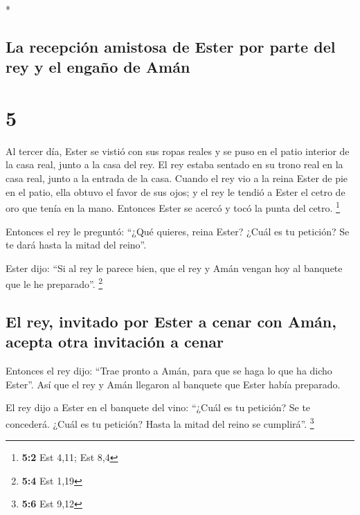 \begin{paracol}{2}
\begin{otherlanguage}{english}
\end{otherlanguage}

\switchcolumn[0]*

\hypertarget{la-recepciuxf3n-amistosa-de-ester-por-parte-del-rey-y-el-engauxf1o-de-amuxe1n}{%
\subsection{La recepción amistosa de Ester por parte del rey y el engaño
de
Amán}\label{la-recepciuxf3n-amistosa-de-ester-por-parte-del-rey-y-el-engauxf1o-de-amuxe1n}}

\hypertarget{section-8}{%
\section{5}\label{section-8}}

 Al tercer día, Ester se vistió con sus ropas reales y se
puso en el patio interior de la casa real, junto a la casa del rey. El
rey estaba sentado en su trono real en la casa real, junto a la entrada
de la casa.  Cuando el rey vio a la reina Ester de pie en
el patio, ella obtuvo el favor de sus ojos; y el rey le tendió a Ester
el cetro de oro que tenía en la mano. Entonces Ester se acercó y tocó la
punta del cetro. \footnote{\textbf{5:2} Est 4,11; Est 8,4}

 Entonces el rey le preguntó: ``¿Qué quieres, reina Ester?
¿Cuál es tu petición? Se te dará hasta la mitad del reino''.

 Ester dijo: ``Si al rey le parece bien, que el rey y Amán
vengan hoy al banquete que le he preparado''. \footnote{\textbf{5:4} Est
  1,19}

\hypertarget{el-rey-invitado-por-ester-a-cenar-con-amuxe1n-acepta-otra-invitaciuxf3n-a-cenar}{%
\subsection{El rey, invitado por Ester a cenar con Amán, acepta otra
invitación a
cenar}\label{el-rey-invitado-por-ester-a-cenar-con-amuxe1n-acepta-otra-invitaciuxf3n-a-cenar}}

 Entonces el rey dijo: ``Trae pronto a Amán, para que se
haga lo que ha dicho Ester''. Así que el rey y Amán llegaron al banquete
que Ester había preparado.

 El rey dijo a Ester en el banquete del vino: ``¿Cuál es
tu petición? Se te concederá. ¿Cuál es tu petición? Hasta la mitad del
reino se cumplirá''. \footnote{\textbf{5:6} Est 9,12}


\end{paracol}
